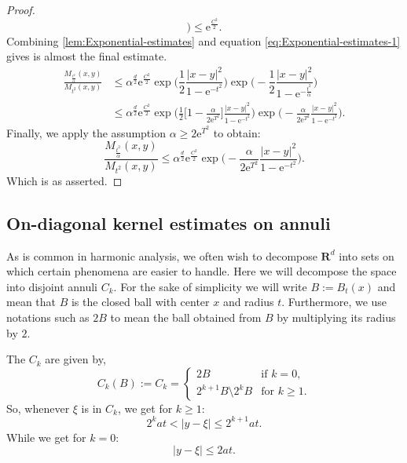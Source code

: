 \documentclass[a4paper,oneside,10pt]{amsproc}
\theoremstyle{plain}
\theoremstyle{remark}
\theoremstyle{definition}
\renewcommand{\leq}{\leqslant}
\renewcommand{\leq}{\leqslant}
\renewcommand{\geq}{\geqslant}
\newcommand{\R}{\mathbf R}
\newcommand{\e}{\mathrm{e}} %
\renewcommand{\leq}{\leqslant}%
\renewcommand{\geq}{\geqslant}%
\begin{document}
\begin{proof}
\begin{equation*}
    \biggr ) \leq \e^{\frac{C^2}2}.
  \end{equation*}
  Combining \autoref{lem:Exponential-estimates} and equation
  \eqref{eq:Exponential-estimates-1} gives is almost the final estimate.
  \begin{align*}
    \frac{M_{\frac{t^2}{\alpha}}(x, y)}{M_{t^2}(x, y)} &\leq
    \alpha^{\frac{d}2} \e^{\frac{C^2}2} \exp\biggl(\dfrac12 \dfrac{|x - y|^2}{1 -
      \e^{-t^2}} \biggr) \exp\biggl(-\dfrac12 \dfrac{|x - y|^2}{1
      - \e^{-\frac{t^2}{\alpha}}}  \biggr)\\
    &\leq \alpha^{\frac{d}2} \e^{\frac{C^2}2} \exp \biggl (\frac12 \biggl[1
    -\frac{\alpha}{2\e^{T^2}} \biggr] \frac{|x - y|^2}{1 - \e^{-t^2}}
    \biggr ) \exp \biggl (-\frac{\alpha}{2\e^{T^2}} \frac{|x - y|^2}{1
      - \e^{-t^2}} \biggr ).
  \end{align*}
  Finally, we apply the assumption $\alpha \geq 2 \e^{T^2}$ to obtain:
  \begin{equation*}
    \frac{M_{\frac{t^2}{\alpha}}(x, y)}{M_{t^2}(x, y)} \leq \alpha^{\frac{d}2}
    \e^{\frac{C^2}2} \exp\biggl(-\frac{\alpha}{2\e^{T^2}} \frac{|x -
      y|^2}{1 - \e^{-t^2}} \biggr).
  \end{equation*}
  Which is as asserted.
\end{proof}

\subsection{On-diagonal kernel estimates on annuli}
As is common in harmonic analysis, we often wish to decompose
$\R^d$ into sets on which certain phenomena are easier to handle. Here
we will decompose the space into disjoint annuli $C_k$. For the sake
of simplicity we will write $B := B_t(x)$ and mean that $B$ is the
closed ball with center $x$ and radius $t$. Furthermore, we use
notations such as $2B$ to mean the ball obtained from $B$ by
multiplying its radius by $2$.

The $C_k$ are given by,
\begin{equation}
  \label{eq:C_k-annulus-decomposition}
  C_k(B) := C_k =
  \begin{cases}
    2B &\text{if $k = 0$,}\\
    2^{k + 1}B \setminus 2^k B &\text{for $k \geq 1$.}
  \end{cases}
\end{equation}
So, whenever $\xi$ is in $C_k$, we get for $k \geq 1$:
\begin{equation}
  \label{eq:C_k-annulus-decomposition-expand-nonzero}
  2^k a t < |y - \xi| \leq 2^{k + 1} a t.
\end{equation}
While we get for $k = 0$:
\begin{equation}
  \label{eq:C_k-annulus-decomposition-expand-zero}
  |y - \xi| \leq 2 a t.
\end{equation}
\end{document}
